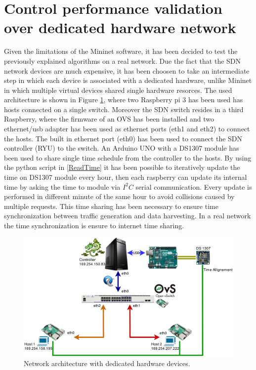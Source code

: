 \section{Control performance validation over dedicated hardware network}
Given the limitations of the Mininet software, it has been decided to test the previously explained algorithms on a real network. Due the fact that the SDN network devices are much expensive, it has been choosen to take an intermediate step in which each device is associated with a dedicated hardware, unlike Mininet in which multiple virtual devices shared single hardware resorces. The used architecture is shown in Figure \ref{fig:{Real_NET}}, where two Raspberry pi 3 \cite{rasp} has been used has hosts connected on a single switch. Moreover the SDN switch resides in a third Raspberry, where the firmware of an OVS has been installed and two ethernet/usb adapter has been used as ethernet ports (eth1 and eth2) to connect the hosts. The built in ethernet port (eth0) has been used to connect the SDN controller (RYU) to the switch. An Arduino UNO with a DS1307 module has been used to share single time schedule from the controller to the hosts. By using the python script in \ref{ReadTime}  it has been possible to iteratively update the time on DS1307 module every hour, then each raspberry can update its internal time by asking the time to module via $I^{2}C$ serial communication. Every update is performed in different minute of the same hour to avoid collisions caused by multiple requests. This time sharing has been necessary to ensure time synchronization between traffic generation and data harvesting. In a real network the time synchronization is ensure to internet time sharing.
\begin{figure}[tb!]
	\centering
	\includegraphics[width=13cm]{figure/Real_NET.png}
	\caption{Network architecture with dedicated hardware devices.}
	\label{fig:{Real_NET}}
\end{figure}
